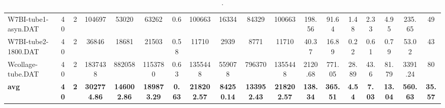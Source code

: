 \begin{sidewaystable}[h]
{\begin{tabular}{lccccccccccccccccc}
W7BI-tube1-asyn.DAT & 40 & 2 & 104697 & 53020 & 63262 & 0.6 & 100663 & 16334 & 84329 & 100663 & 198.56 & 91.64 & 1.48 & 2.33 & 4.95 & 235.65 & 49\\
W7BI-tube2-1800.DAT & 40 & 2 & 36846 & 18681 & 21503 & 0.58 & 11710 & 2939 & 8771 & 11710 & 40.37 & 16.89 & 0.22 & 0.61 & 0.79 & 53.02 & 43\\
Wcollage-tube.DAT & 40 & 2 & 1837438 & 882058 & 1153780 & 0.63 & 1355448 & 559078 & 796370 & 1355448 & 2120.68 & 771.05 & 28.89 & 43.6 & 81.79 & 3391.24 & 80\\
\cline{1-18} \textbf{avg} & \textbf{40} & \textbf{2} & \textbf{302774.86} & \textbf{146002.86} & \textbf{189873.29} & \textbf{0.63} & \textbf{218202.57} & \textbf{84250.14} & \textbf{133952.43} & \textbf{218202.57} & \textbf{138.34} & \textbf{365.51} & \textbf{4.54} & \textbf{7.03} & \textbf{13.04} & \textbf{560.63} & \textbf{35.57} \\ \cline{1-18}
\bottomrule
\end{tabular}%
}%
\caption{.}
\label{tab:table_bc}
\end{sidewaystable}

